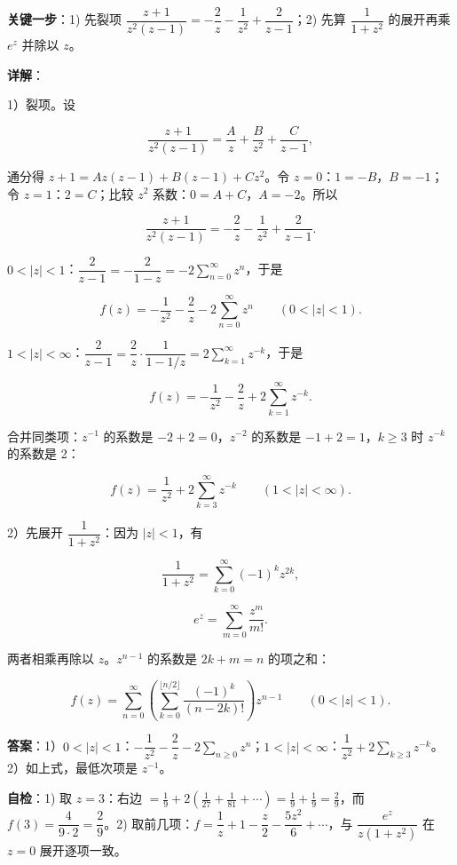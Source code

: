 \documentclass[11pt]{ctexart}
\renewcommand{\qbreak}{\needspace{0.45\textheight}}
\begin{document}
\textbf{关键一步}：1) 先裂项 $\dfrac{z+1}{z^2(z-1)}=-\dfrac2z-\dfrac1{z^2}+\dfrac{2}{z-1}$；2) 先算 $\dfrac{1}{1+z^2}$ 的展开再乘 $e^z$ 并除以 $z$。

\textbf{详解}：

1）裂项。设

\[ \frac{z+1}{z^2(z-1)}=\frac{A}{z}+\frac{B}{z^2}+\frac{C}{z-1} , \]

通分得 $z+1=Az(z-1)+B(z-1)+Cz^2$。令 $z=0$：$1=-B$，$B=-1$；令 $z=1$：$2=C$；比较 $z^2$ 系数：$0=A+C$，$A=-2$。所以

\[ \frac{z+1}{z^2(z-1)}=-\frac2z-\frac1{z^2}+\frac{2}{z-1} . \]

\textbf{$0<|z|<1$}：$\dfrac{2}{z-1}=-\dfrac{2}{1-z}=-2\sum_{n=0}^{\infty}z^n$，于是

\[ f(z)=-\frac{1}{z^2}-\frac2z-2\sum_{n=0}^{\infty}z^n\qquad(0<|z|<1) . \]

\textbf{$1<|z|<\infty$}：$\dfrac{2}{z-1}=\dfrac2z\cdot\dfrac{1}{1-1/z}=2\sum_{k=1}^{\infty}z^{-k}$，于是

\[ f(z)=-\frac1{z^2}-\frac2z+2\sum_{k=1}^{\infty}z^{-k} . \]

合并同类项：$z^{-1}$ 的系数是 $-2+2=0$，$z^{-2}$ 的系数是 $-1+2=1$，$k\ge3$ 时 $z^{-k}$ 的系数是 2：

\[ f(z)=\frac{1}{z^2}+2\sum_{k=3}^{\infty}z^{-k}\qquad(1<|z|<\infty) . \]

2）先展开 $\dfrac{1}{1+z^2}$：因为 $|z|<1$，有

\[ \frac{1}{1+z^2}=\sum_{k=0}^{\infty}(-1)^kz^{2k} , \]

\[ e^z=\sum_{m=0}^{\infty}\frac{z^m}{m!} . \]

两者相乘再除以 $z$。$z^{n-1}$ 的系数是 $2k+m=n$ 的项之和：

\[ f(z)=\sum_{n=0}^{\infty}\left(\sum_{k=0}^{\lfloor n/2\rfloor}\frac{(-1)^k}{(n-2k)!}\right)z^{n-1}\qquad(0<|z|<1) . \]

\textbf{答案}：1）$0<|z|<1$：$-\dfrac1{z^2}-\dfrac2z-2\sum_{n\ge0}z^n$；$1<|z|<\infty$：$\dfrac1{z^2}+2\sum_{k\ge3}z^{-k}$。2）如上式，最低次项是 $z^{-1}$。

\textbf{自检}：1) 取 $z=3$：右边 $=\tfrac19+2\left(\tfrac1{27}+\tfrac1{81}+\cdots\right)=\tfrac19+\tfrac19=\tfrac29$，而 $f(3)=\dfrac{4}{9\cdot2}=\dfrac29$。2) 取前几项：$f=\dfrac1z+1-\dfrac z2-\dfrac{5z^2}{6}+\cdots$，与 $\dfrac{e^z}{z(1+z^2)}$ 在 $z=0$ 展开逐项一致。

\qbreak
{}
\end{document}
